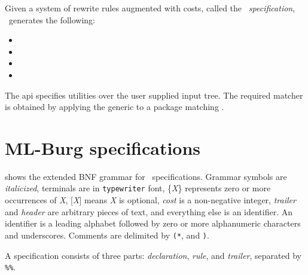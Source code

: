 Given a system of rewrite rules augmented with costs, called the {\em
\mlburg\ specification}, \mlburg\ generates the following:

\begin{itemize}
	\item{}
	\item{}
	\item{}
	\item{}
\end{itemize}

The api  specifies utilities over the 
user supplied input
tree. The required matcher is obtained by applying the generic
 to a package matching .



		\section{ML-Burg specifications}

 shows the extended BNF grammar for 
\mlburg\ specifications. Grammar symbols are {\it italicized}, terminals
are in {\tt typewriter} font, \{{\it X}\} represents zero or more
occurrences of {\it X}, {\rm [}{\it X}{\rm ]} means {\it X} is optional, 
{\sl cost} is a non-negative integer, {\sl trailer} and {\sl header}
are arbitrary pieces of text, and everything else is an identifier.
An identifier is a leading alphabet followed by zero or more
alphanumeric characters and underscores. Comments are delimited
by {\tt (*}, and {\tt *)}. 

A specification consists of three parts: {\it declaration}, {\it rule},
and {\sl trailer}, separated by \verb|%%|.



